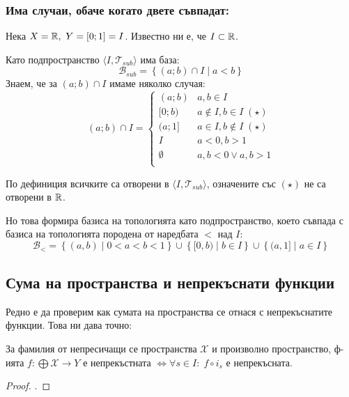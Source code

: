 \subsubsection*{Има случаи, обаче когато двете съвпадат:}
\begin{example}
    Нека $X = {\mathbb{R}},\ Y = [0; 1] = I$. Известно ни е, че $I \subset {\mathbb{R}}$.

    Като подпространство $\langle I, \mathcal T_{sub}\rangle$ има база:
    \begin{equation}
        \mathcal B_{sub} = \left\{(a; b) \cap I\mid a < b\right\}
    \end{equation}
    Знаем, че за $(a; b) \cap I$ имаме няколко случая:
    \begin{equation}
        (a; b) \cap I = \begin{cases}
            (a; b)      & a, b \in I \\
            [0; b)      & a \notin I, b \in I\; (\star)\\
            (a; 1]      & a \in I, b \notin I\; (\star)\\
            I           & a < 0, b > 1 \\
            \emptyset   & a, b < 0 \lor a, b > 1 \\
        \end{cases}
    \end{equation}

    По дефиниция всичките са отворени в $\langle I, \mathcal T_{sub} \rangle$, означените със $(\star)$ не са отворени в ${\mathbb{R}}$. 
    
    Но това формира базиса на топологията като подпространство, което съвпада с базиса на топологията породена от наредбата $<$ над $I$:
    \begin{equation}
         \mathcal B_< = \left\{(a,b) \mid 0 < a < b < 1\right\} \cup \left\{ [0, b) \mid b \in I \right\} \cup \left\{ (a, 1] \mid a \in I \right\}
    \end{equation}
\end{example}

\subsection{Сума на пространства и непрекъснати функции}
Редно е да проверим как сумата на пространства се отнася с непрекъснатите функции. Това ни дава точно:
\begin{theorem}
    За фамилия от непресичащи се пространства $\mathcal X$ и произволно пространство, ф-ията $f : \bigoplus \mathcal X \to Y$ е непрекъстната $\iff \forall s \in I:\; f \circ  i_s$ е непрекъсната.
\end{theorem}
\begin{proof}
    \cite[стр.~75]{engelking1989general}.
\end{proof}

